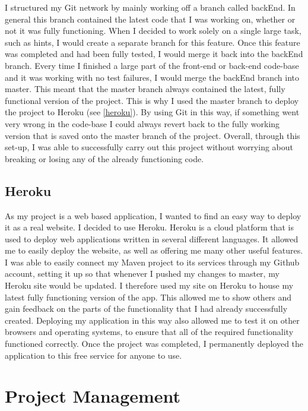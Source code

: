 I structured my Git network by mainly working off a branch called backEnd. In general this branch contained the latest code that I was working on, whether or not it was fully functioning. When I decided to work solely on a single large task, such as hints, I would create a separate branch for this feature. Once this feature was completed and had been fully tested, I would merge it back into the backEnd branch. Every time I finished a large part of the front-end or back-end code-base and it was working with no test failures, I would merge the backEnd branch into master. This meant that the master branch always contained the latest, fully functional version of the project. This is why I used the master branch to deploy the project to Heroku (see \ref{heroku}). By using Git in this way,  if something went very wrong in the code-base I could always revert back to the fully working version that is saved onto the master branch of the project. Overall, through this set-up, I was able to successfully carry out this project without worrying about breaking or losing any of the already functioning code.

\subsection{Heroku\label{heroku}}
As my project is a web based application, I wanted to find an easy way to deploy it as a real website. I decided to use Heroku. Heroku is a cloud platform that is used to deploy web applications written in several different languages. It allowed me to easily deploy the website, as well as offering me many other useful features. I was able to easily connect my Maven project to its services through my Github account, setting it up so that whenever I pushed my changes to master, my Heroku site would be updated. I therefore used my site on Heroku to house my latest fully functioning version of the app. This allowed me to show others and gain feedback on the parts of the functionality that I had already successfully created. Deploying my application in this way also allowed me to test it on other browsers and operating systems, to ensure that all of the required functionality functioned correctly. Once the project was completed, I permanently deployed the application to this free service for anyone to use.

\pagebreak

\section{Project Management}

